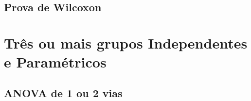 \documentclass[
]{book}
\begin{document}
\hypertarget{prova-de-wilcoxon}{%
\section{Prova de Wilcoxon}\label{prova-de-wilcoxon}}

\hypertarget{truxeas-ou-mais-grupos-independentes-e-paramuxe9tricos}{%
\chapter{Três ou mais grupos Independentes e Paramétricos}\label{truxeas-ou-mais-grupos-independentes-e-paramuxe9tricos}}

\hypertarget{anova-de-1-ou-2-vias}{%
\section{ANOVA de 1 ou 2 vias}\label{anova-de-1-ou-2-vias}}

  
\end{document}
